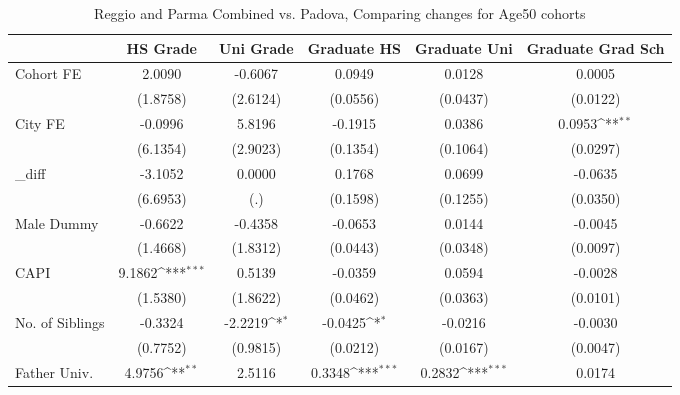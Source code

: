 \begin{table}[htbp]\centering
\def\sym#1{\ifmmode^{#1}\else\(^{#1}\)\fi}
\caption{Reggio and Parma Combined vs. Padova, Comparing changes for Age50 cohorts}
\begin{tabular}{l*{5}{c}}
\toprule
            &\multicolumn{1}{c}{HS Grade}&\multicolumn{1}{c}{Uni Grade}&\multicolumn{1}{c}{Graduate HS}&\multicolumn{1}{c}{Graduate Uni}&\multicolumn{1}{c}{Graduate Grad Sch}\\
\midrule
Cohort FE   &      2.0090         &     -0.6067         &      0.0949         &      0.0128         &      0.0005         \\
            &    (1.8758)         &    (2.6124)         &    (0.0556)         &    (0.0437)         &    (0.0122)         \\
\addlinespace
City FE     &     -0.0996         &      5.8196         &     -0.1915         &      0.0386         &      0.0953\sym{**} \\
            &    (6.1354)         &    (2.9023)         &    (0.1354)         &    (0.1064)         &    (0.0297)         \\
\addlinespace
\_diff       &     -3.1052         &      0.0000         &      0.1768         &      0.0699         &     -0.0635         \\
            &    (6.6953)         &         (.)         &    (0.1598)         &    (0.1255)         &    (0.0350)         \\
\addlinespace
Male Dummy  &     -0.6622         &     -0.4358         &     -0.0653         &      0.0144         &     -0.0045         \\
            &    (1.4668)         &    (1.8312)         &    (0.0443)         &    (0.0348)         &    (0.0097)         \\
\addlinespace
CAPI        &      9.1862\sym{***}&      0.5139         &     -0.0359         &      0.0594         &     -0.0028         \\
            &    (1.5380)         &    (1.8622)         &    (0.0462)         &    (0.0363)         &    (0.0101)         \\
\addlinespace
No. of Siblings&     -0.3324         &     -2.2219\sym{*}  &     -0.0425\sym{*}  &     -0.0216         &     -0.0030         \\
            &    (0.7752)         &    (0.9815)         &    (0.0212)         &    (0.0167)         &    (0.0047)         \\
\addlinespace
Father Univ.&      4.9756\sym{**} &      2.5116         &      0.3348\sym{***}&      0.2832\sym{***}&      0.0174         \\

\end{tabular}
\end{table}
